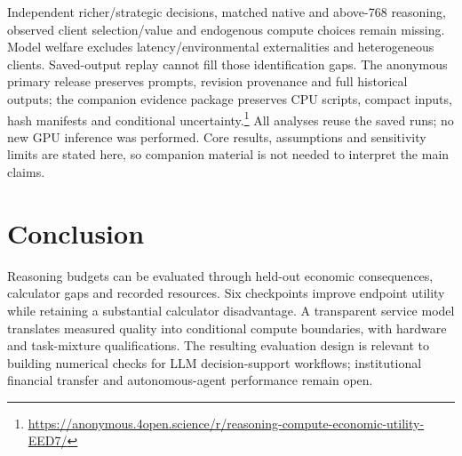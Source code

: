 \documentclass[sigconf,anonymous,nonacm]{acmart}
\begin{document}
Independent richer/strategic decisions, matched native and above-768 reasoning, observed client selection/value and endogenous compute choices remain missing. Model welfare excludes latency/environmental externalities and heterogeneous clients. Saved-output replay cannot fill those identification gaps. The anonymous primary release preserves prompts, revision provenance and full historical outputs; the companion evidence package preserves CPU scripts, compact inputs, hash manifests and conditional uncertainty.\footnote{\url{https://anonymous.4open.science/r/reasoning-compute-economic-utility-EED7/}} All analyses reuse the saved runs; no new GPU inference was performed. Core results, assumptions and sensitivity limits are stated here, so companion material is not needed to interpret the main claims.
\section{Conclusion}
Reasoning budgets can be evaluated through held-out economic consequences, calculator gaps and recorded resources. Six checkpoints improve endpoint utility while retaining a substantial calculator disadvantage. A transparent service model translates measured quality into conditional compute boundaries, with hardware and task-mixture qualifications. The resulting evaluation design is relevant to building numerical checks for LLM decision-support workflows; institutional financial transfer and autonomous-agent performance remain open.


\end{document}
